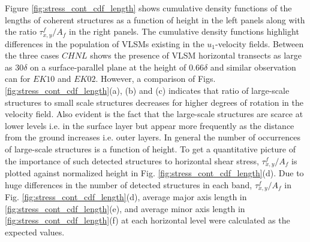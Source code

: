 \documentclass{svjour3}                     %
\begin{document}
Figure \ref{fig:stress_cont_cdf_length}  shows cumulative density functions of the lengths of coherent structures as a function of height in the left panels along with the ratio  $\tau_{x,y}^f/A_f$ in the right  panels. The cumulative density functions highlight differences in the population of VLSMs existing  in the $u_1$-velocity fields. Between the three cases $CHNL$ shows the presence of VLSM horizontal transects  as large as $30\delta$ on a surface-parallel plane at the height of  $0.66\delta$ and similar observation can  for $EK10$ and $EK02$. However,  a comparison of Figs. \ref{fig:stress_cont_cdf_length}(a), (b) and (c) indicates that ratio of large-scale structures to small scale structures decreases for higher degrees of rotation  in the velocity field. Also evident is the fact that the large-scale structures are scarce at lower levels i.e. in the surface layer but appear more frequently as the distance from the ground increases  i.e. outer layers. In general the number of occurrences of large-scale structures is a function of height.  To get a quantitative picture of the importance of such detected structures to horizontal shear stress, $\tau_{x,y}^f/A_f$ is plotted against normalized height in Fig. \ref{fig:stress_cont_cdf_length}(d).  Due to huge differences in the number of detected structures in each band, $\tau_{x,y}^f/A_f$ in Fig. \ref{fig:stress_cont_cdf_length}(d), average major axis length in \ref{fig:stress_cont_cdf_length}(e), and average minor axis length in \ref{fig:stress_cont_cdf_length}(f) at each horizontal level were calculated as the expected values. 
\end{document}
